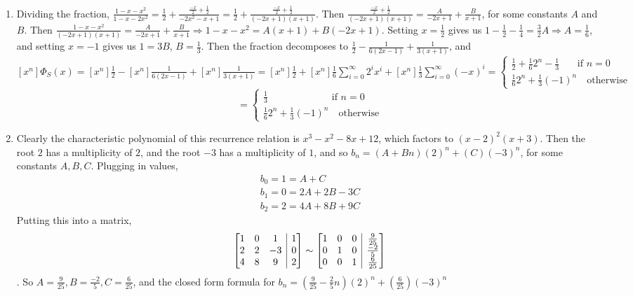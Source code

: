 \documentclass[10pt,english]{article}
\makeatletter
\newenvironment{amatrix}[1]{%
  \left[\begin{array}{@{}*{#1}{c}|c@{}}
}{%
  \end{array}\right]
}
\makeatother
\begin{document}
\begin{enumerate}
\pagebreak
\item Dividing the fraction, $\frac{1-x-x^2}{1-x-2x^2}=\frac{1}{2}+\frac{\frac{-x}{2}+\frac{1}{2}}{-2x^2-x+1}=\frac{1}{2}+\frac{\frac{-x}{2}+\frac{1}{2}}{(-2x+1)(x+1)}$. Then $\frac{\frac{-x}{2}+\frac{1}{2}}{(-2x+1)(x+1)}=\frac{A}{-2x+1}+\frac{B}{x+1}$, for some constants $A$ and $B$. Then $\frac{1-x-x^2}{(-2x+1)(x+1)}=\frac{A}{-2x+1}+\frac{B}{x+1}\Rightarrow1-x-x^2=A(x+1)+B(-2x+1)$. Setting $x=\frac{1}{2}$ gives us $1-\frac{1}{2}-\frac{1}{4}=\frac{3}{2}A\Rightarrow A=\frac{1}{6}$, and setting $x=-1$ gives us $1=3B$, $B=\frac{1}{3}$. Then the fraction decomposes to $\frac{1}{2}-\frac{1}{6(2x-1)}+\frac{1}{3(x+1)}$, and $[x^n]\Phi_S(x)=[x^n]\frac{1}{2}-[x^n]\frac{1}{6(2x-1)}+[x^n]\frac{1}{3(x+1)}=[x^n]\frac{1}{2}+[x^n]\frac{1}{6}\sum_{i=0}^\infty2^ix^i+[x^n]\frac{1}{3}\sum_{i=0}^\infty (-x)^i=\begin{cases}\frac{1}{2}+\frac{1}{6}2^n-\frac{1}{3}\quad\,\,\,\,\,\text{if }n=0\\\frac{1}{6}2^n+\frac{1}{3}(-1)^n\quad\text{otherwise}\end{cases}$ $$=\begin{cases}\frac{1}{3}\quad\quad\quad\quad\quad\quad\,\,\,\text{if }n=0\\\frac{1}{6}2^n+\frac{1}{3}(-1)^n\quad\text{otherwise}\end{cases}$$

\pagebreak
\item Clearly the characteristic polynomial of this recurrence relation is $x^3-x^2-8x+12$, which factors to $(x-2)^2(x+3)$. Then the root $2$ has a multiplicity of $2$, and the root $-3$ has a multiplicity of $1$, and so $b_n=(A+Bn)(2)^n+(C)(-3)^n$, for some constants $A,B,C$. Plugging in values, \begin{align*}b_0=1=A+C\\b_1=0=2A+2B-3C\\b_2=2=4A+8B+9C\end{align*} Putting this into a matrix, $$\begin{amatrix}{3}1&0&1&1\\2&2&-3&0\\4&8&9&2\end{amatrix}\sim\begin{amatrix}{3}1&0&0&\frac{9}{25}\\0&1&0&\frac{-2}{5}\\0&0&1&\frac{6}{25}\end{amatrix}$$. So $A=\frac{9}{25},B=\frac{-2}{5},C=\frac{6}{25}$, and the closed form formula for $b_n=\left(\frac{9}{25}-\frac{2}{5}n\right)(2)^n+\left(\frac{6}{25}\right)(-3)^n$


\end{enumerate}
\end{document}
